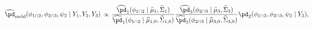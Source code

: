 \begin{equation}
  \widehat{\pd}_{\text{meld}} (\phi_{1 \cap 2}, \phi_{2 \cap 3}, \psi_{2} \mid Y_{1}, Y_{2}, Y_{3})
  \, \propto \,
  \frac {
    \widehat{\pd}_{1}(\phi_{1 \cap 2} \mid \widehat{\mu}_{1}, \widehat{\Sigma}_{1})
  } {
    \widehat{\pd}_{1}(\phi_{1 \cap 2} \mid \widehat{\mu}_{1, 0}, \widehat{\Sigma}_{1, 0})
  }
  \frac {
    \widehat{\pd}_{3}(\phi_{2 \cap 3} \mid \widehat{\mu}_{3}, \widehat{\Sigma}_{3})
  } {
    \widehat{\pd}_{3}(\phi_{2 \cap 3} \mid \widehat{\mu}_{3, 0}, \widehat{\Sigma}_{3, 0})
  }
  \pd_{2}(\phi_{1 \cap 2}, \phi_{2 \cap 3}, \psi_{2} \mid Y_{2}),
  \label{eqn:normal-approximation-approximate-target}
\end{equation}